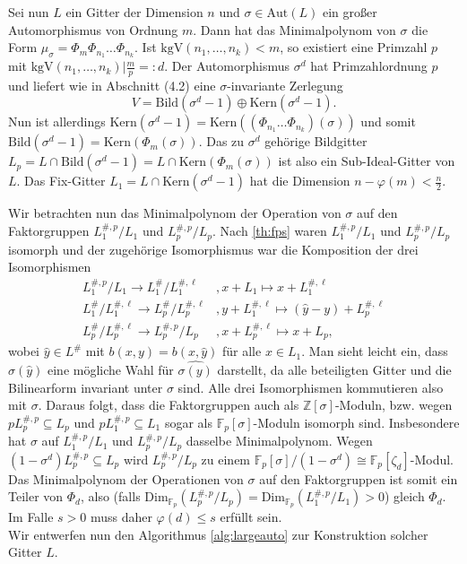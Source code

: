 \documentclass[12pt,a4paper,halfparskip,headsepline,bibtotocnumbered]{scrreprt}
\theoremstyle{nummermitklammern}
\theoremstyle{nonumberbreak}
\newcommand{\Z}{\mathbb{Z}}
\newcommand{\F}{\mathbb{F}}
\newcommand{\Kern}{\text{Kern}}
\newcommand{\Bild}{\text{Bild}}
\newcommand{\kgV}{\text{kgV}}
\newcommand{\Aut}{\text{Aut}}
\newcommand{\Dim}{\text{Dim}}
\begin{document}
Sei nun $L$ ein Gitter der Dimension $n$ und $\sigma \in \Aut(L)$ ein großer Automorphismus von Ordnung $m$. Dann hat das Minimalpolynom von $\sigma$ die Form $\mu_\sigma = \Phi_m \Phi_{n_1} \dots \Phi_{n_k}$. Ist $\kgV(n_1, \dots, n_k) < m$, so existiert eine Primzahl $p$ mit $\kgV(n_1, \dots, n_k) \vert \frac{m}{p} =: d$. Der Automorphismus $\sigma^d$ hat Primzahlordnung $p$ und liefert wie in Abschnitt (4.2) eine $\sigma$-invariante Zerlegung 
\begin{equation*}
	V = \Bild(\sigma^d-1) \oplus \Kern(\sigma^d-1).
\end{equation*}
Nun ist allerdings $\Kern(\sigma^d-1) = \Kern\left((\Phi_{n_1} \dots \Phi_{n_k})(\sigma)\right)$ und somit $\Bild(\sigma^d-1) = \Kern(\Phi_m(\sigma))$. Das zu $\sigma^d$ gehörige Bildgitter $L_p = L \cap \Bild(\sigma^d-1) = L \cap \Kern(\Phi_m(\sigma))$ ist also ein Sub-Ideal-Gitter von $L$. Das Fix-Gitter $L_1 = L \cap \Kern(\sigma^d-1)$ hat die Dimension $n-\varphi(m) < \frac{n}{2}$.\par
Wir betrachten nun das Minimalpolynom der Operation von $\sigma$ auf den Faktorgruppen $L_1^{\#,p}/L_1$ und $L_p^{\#,p} / L_p$. Nach \eqref{th:fps} waren $L_1^{\#,p}/L_1$ und $L_p^{\#,p} / L_p$ isomorph und der zugehörige Isomorphismus war die Komposition der drei Isomorphismen
\begin{align*}
	L_1^{\#,p} / L_1 \rightarrow L_1^\# / L_1^{\#, \ell}&, x + L_1 \mapsto x + L_1^{\#, \ell}\\
	L_1^\#/L_1^{\#,\ell} \rightarrow L_p^\# / L_p^{\#,\ell}&, y + L_1^{\#, \ell} \mapsto (\hat{y} - y) + L_p^{\#, \ell}\\
	L_p^\# / L_p^{\#, \ell} \rightarrow L_p^{\#,p} / L_p&, x + L_p^{\#, \ell} \mapsto x + L_p,
\end{align*}
wobei $\hat{y} \in L^\#$ mit $b(x,y) = b(x,\hat{y})$ für alle $x \in L_1$. Man sieht leicht ein, dass $\sigma(\hat{y})$ eine mögliche Wahl für $\widehat{\sigma(y)}$ darstellt, da alle beteiligten Gitter und die Bilinearform invariant unter $\sigma$ sind. Alle drei Isomorphismen kommutieren also mit $\sigma$. Daraus folgt, dass die Faktorgruppen auch als $\Z[\sigma]$-Moduln, bzw. wegen $p L_p^{\#,p} \subseteq L_p$ und $p L_1^{\#,p} \subseteq L_1$ sogar als $\F_p[\sigma]$-Moduln isomorph sind. Insbesondere hat $\sigma$ auf $L_1^{\#,p}/L_1$ und $L_p^{\#,p}/L_p$ dasselbe Minimalpolynom. Wegen $(1-\sigma^d) L_p^{\#,p} \subseteq L_p$ wird $L_p^{\#,p}/L_p$ zu einem $\F_p[\sigma] / (1-\sigma^d) \cong \F_p[\zeta_d]$-Modul. Das Minimalpolynom der Operationen von $\sigma$ auf den Faktorgruppen ist somit ein Teiler von $\Phi_d$, also (falls $\Dim_{\F_p}(L_p^{\#,p}/L_p) = \Dim_{\F_p}(L_1^{\#,p}/L_1) > 0$) gleich $\Phi_d$. Im Falle $s > 0$ muss daher $\varphi(d) \leq s$ erfüllt sein.\\
Wir entwerfen nun den Algorithmus \eqref{alg:largeauto} zur Konstruktion solcher Gitter $L$.
\end{document}
